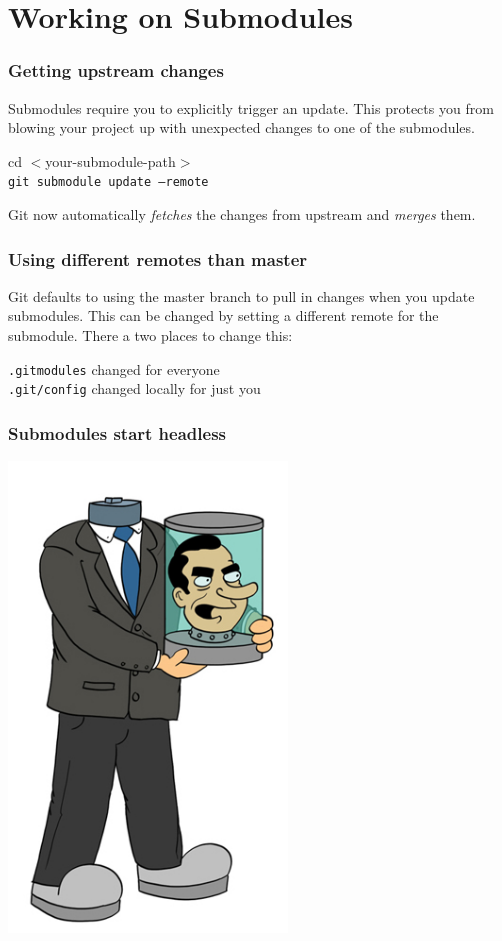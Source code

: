 \documentclass[10pt]{beamer}
\begin{document}
\section{Working on Submodules}

\begin{frame}[fragile]
  \frametitle{Getting upstream changes}
   Submodules require you to  \alert{explicitly} trigger an update.
   This protects you from blowing your project up with unexpected changes to one of the submodules.    
  \begin{center}cd $<$your-submodule-path$>$\\ \texttt{git submodule update --remote} \end{center}
  
  Git now automatically \emph{fetches} the changes from upstream and \emph{merges} them.

\end{frame}

\begin{frame}[fragile]
  \frametitle{Using different remotes than master}
  Git defaults to using the master branch to pull in changes when you update submodules.
  This can be changed by setting a different remote for the submodule. There a two places to change this:
\begin{center} 
  \texttt{.gitmodules} changed for everyone \\
  \texttt{.git/config} changed locally for just you
\end{center}
\end{frame}

\begin{frame}
\frametitle{Submodules start headless}
 \begin{center}
 \includegraphics[width=280px]{images/nixon.jpg}
 \end{center}
\end{frame}
\end{document}
